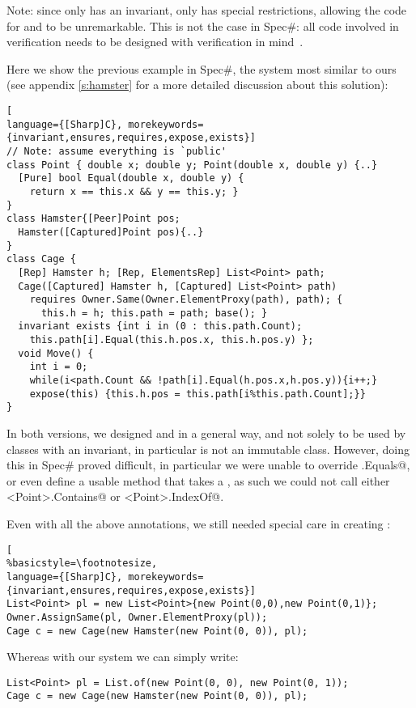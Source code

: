 Note: since only \Q@Cage@ has an invariant,
 only \Q@Cage@ has special restrictions, allowing the code for \Q@Point@ and \Q@Hamster@ to be unremarkable.
 This is not the case in Spec\#: all code involved in  verification needs to be designed with verification in mind~\cite{barnett2011specification}.

 Here we show the previous example in Spec\#, the system most similar to ours (see appendix \ref{s:hamster} for a more detailed discussion about this solution):
\begin{lstlisting}[
language={[Sharp]C}, morekeywords={invariant,ensures,requires,expose,exists}]
// Note: assume everything is `public'
class Point { double x; double y; Point(double x, double y) {..}
  [Pure] bool Equal(double x, double y) {
    return x == this.x && y == this.y; }
}
class Hamster{[Peer]Point pos; 
  Hamster([Captured]Point pos){..}
}
class Cage {
  [Rep] Hamster h; [Rep, ElementsRep] List<Point> path;
  Cage([Captured] Hamster h, [Captured] List<Point> path)
    requires Owner.Same(Owner.ElementProxy(path), path); {
      this.h = h; this.path = path; base(); }
  invariant exists {int i in (0 : this.path.Count);
    this.path[i].Equal(this.h.pos.x, this.h.pos.y) };
  void Move() {
    int i = 0;
    while(i<path.Count && !path[i].Equal(h.pos.x,h.pos.y)){i++;}
    expose(this) {this.h.pos = this.path[i%this.path.Count];}}
}
\end{lstlisting}
In both versions, we designed \Q@Point@ and \Q@Hamster@ in a general way, and not solely to be used by classes with an invariant, in particular \Q@Point@ is not an immutable class. However, doing this in Spec\# proved difficult, in particular we were unable to override \Q@Object.Equals@, or even define a usable \Q@equals@ method that takes a \Q@Point@, as such we could not call either \Q@List<Point>.Contains@ or \Q@List<Point>.IndexOf@.
 
Even with all the above annotations, we still needed special care in creating \Q@Cage@s:
\begin{lstlisting}[
%basicstyle=\footnotesize,
language={[Sharp]C}, morekeywords={invariant,ensures,requires,expose,exists}]
List<Point> pl = new List<Point>{new Point(0,0),new Point(0,1)};
Owner.AssignSame(pl, Owner.ElementProxy(pl));
Cage c = new Cage(new Hamster(new Point(0, 0)), pl);
\end{lstlisting}
Whereas with our system we can simply write:
\begin{lstlisting}
List<Point> pl = List.of(new Point(0, 0), new Point(0, 1));
Cage c = new Cage(new Hamster(new Point(0, 0)), pl);
\end{lstlisting}

